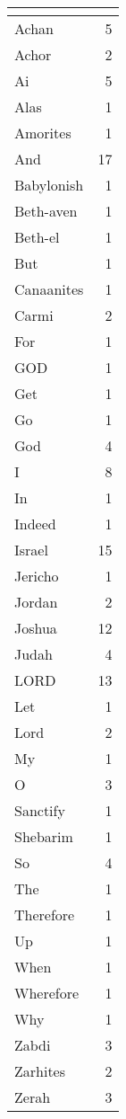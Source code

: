 \begin{center}
\begin{longtable}{l|r}
\hline \multicolumn{2}{c}{{ }} \\ \hline
\endfoot 
Achan & 5\\ \hline 
Achor & 2\\ \hline 
Ai & 5\\ \hline 
Alas & 1\\ \hline 
Amorites & 1\\ \hline 
And & 17\\ \hline 
Babylonish & 1\\ \hline 
Beth-aven & 1\\ \hline 
Beth-el & 1\\ \hline 
But & 1\\ \hline 
Canaanites & 1\\ \hline 
Carmi & 2\\ \hline 
For & 1\\ \hline 
GOD & 1\\ \hline 
Get & 1\\ \hline 
Go & 1\\ \hline 
God & 4\\ \hline 
I & 8\\ \hline 
In & 1\\ \hline 
Indeed & 1\\ \hline 
Israel & 15\\ \hline 
Jericho & 1\\ \hline 
Jordan & 2\\ \hline 
Joshua & 12\\ \hline 
Judah & 4\\ \hline 
LORD & 13\\ \hline 
Let & 1\\ \hline 
Lord & 2\\ \hline 
My & 1\\ \hline 
O & 3\\ \hline 
Sanctify & 1\\ \hline 
Shebarim & 1\\ \hline 
So & 4\\ \hline 
The & 1\\ \hline 
Therefore & 1\\ \hline 
Up & 1\\ \hline 
When & 1\\ \hline 
Wherefore & 1\\ \hline 
Why & 1\\ \hline 
Zabdi & 3\\ \hline 
Zarhites & 2\\ \hline 
Zerah & 3\\ \hline 

\end{longtable}
\end{center}
